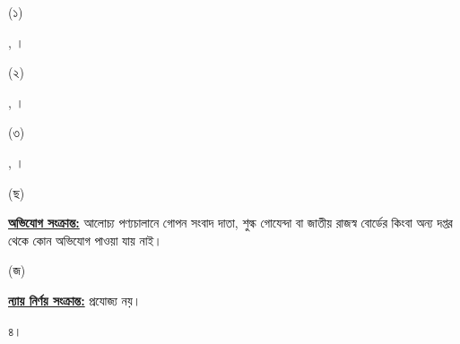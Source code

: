 \documentclass[12pt]{article}
\begin{document}
\begin{minipage}[t]{0.05\linewidth}
(১)
\end{minipage}
\begin{minipage}[t]{0.85\linewidth}
{\nbrosnt}, {\nbrosnd}।
\end{minipage}
\begin{minipage}[t]{0.1\linewidth}
\hspace{1em}
\end{minipage}
\begin{minipage}[t]{0.05\linewidth}
(২)
\end{minipage}
\begin{minipage}[t]{0.85\linewidth}
{\nbrfs}, {\nbrfsd}।
\end{minipage}
\begin{minipage}[t]{0.1\linewidth}
\hspace{1em}
\end{minipage}
\begin{minipage}[t]{0.05\linewidth}
(৩)
\end{minipage}
\begin{minipage}[t]{0.85\linewidth}
{\srooof}, {\srooofd}।
\\
\end{minipage}
\normalsize
\begin{minipage}[t]{0.05\linewidth}
\hspace{1em}
\end{minipage}
\begin{minipage}[t]{0.05\linewidth}
(ছ)
\end{minipage}
\begin{minipage}[t]{0.90\linewidth}
\underline{\textbf{অভিযোগ সংক্রান্ত:}} আলোচ্য পণ্যচালানে
গোপন সংবাদ দাতা, শুল্ক গোযেন্দা বা
জাতীয় রাজস্ব বোর্ডের কিংবা অন্য দপ্তর থেকে
কোন অভিযোগ পাওয়া যায় নাই।
\\
\end{minipage}
\begin{minipage}[t]{0.05\linewidth}
\hspace{1em}
\end{minipage}
\begin{minipage}[t]{0.05\linewidth}
(জ)
\end{minipage}
\begin{minipage}[t]{0.90\linewidth}
\underline{\textbf{ন্যায় নির্ণয় সংক্রান্ত:}} প্রযোজ্য নয়।
\\
\end{minipage}
\begin{minipage}[t]{0.05\linewidth}
৪।
\end{minipage}
\end{document}
